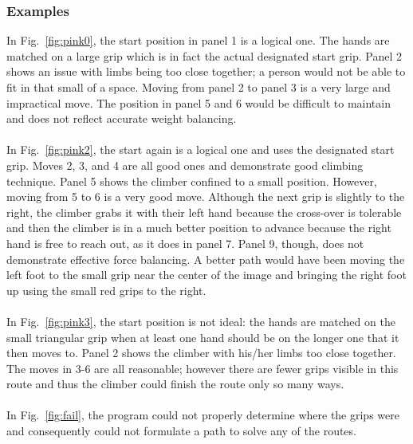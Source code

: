 \documentclass[pdftex,12pt]{article}
\theoremstyle{definition}
\theoremstyle{remark}
\begin{document}
\subsubsection*{Examples}
In Fig.~\eqref{fig:pink0}, the start position in panel 1 is a logical one. The hands are matched on a large grip which is in fact the actual designated start grip. Panel 2 shows an issue with limbs being too close together; a person would not be able to fit in that small of a space. Moving from panel 2 to panel 3 is a very large and impractical move. The position in panel 5 and 6 would be difficult to maintain and does not reflect accurate weight balancing.\\ \\
In Fig.~\eqref{fig:pink2}, the start again is a logical one and uses the designated start grip. Moves 2, 3, and 4 are all good ones and demonstrate good climbing technique. Panel 5 shows the climber confined to a small position. However, moving from 5 to 6 is a very good move. Although the next grip is slightly to the right, the climber grabs it with their left hand because the cross-over is tolerable and then the climber is in a much better position to advance because the right hand is free to reach out, as it does in panel 7. Panel 9, though, does not demonstrate effective force balancing. A better path would have been moving the left foot to the small grip near the center of the image and bringing the right foot up using the small red grips to the right.\\ \\
In Fig.~\eqref{fig:pink3}, the start position is not ideal: the hands are matched on the small triangular grip when at least one hand should be on the longer one that it then moves to. Panel 2 shows the climber with his/her limbs too close together. The moves in 3-6 are all reasonable; however there are fewer grips visible in this route and thus the climber could finish the route only so many ways. \\ \\
In Fig.~\eqref{fig:fail}, the program could not properly determine where the grips were and consequently could not formulate a path to solve any of the routes.
\end{document}
